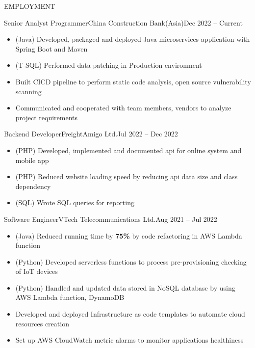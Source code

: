 \documentclass[]{resume}
\begin{document}
	\makeheader
	
	\begin{cvsection}{EMPLOYMENT}
		\begin{cvsubsection}{Senior Analyst Programmer}{China Construction Bank(Asia)}{Dec 2022 -- Current}
			\begin{itemize}
				\item (Java) Developed, packaged and deployed Java microservices application with Spring Boot and Maven
				\item (T-SQL) Performed data patching in Production environment 
				\item Built CICD pipeline to perform static code analysis, open source vulnerability scanning
				\item Communicated and cooperated with team members, vendors to analyze project requirements
			\end{itemize}
		\end{cvsubsection}
		
		\begin{cvsubsection}{Backend Developer}{FreightAmigo Ltd.}{Jul 2022 -- Dec 2022}
			\begin{itemize}
				\item (PHP) Developed, implemented and documented api for online system and mobile app
				\item (PHP) Reduced website loading speed by reducing api data size and class dependency
				\item (SQL) Wrote SQL queries for reporting
			\end{itemize}
		\end{cvsubsection}
		
		\begin{cvsubsection}{Software Engineer}{VTech Telecommunications Ltd.}{Aug 2021 -- Jul 2022}
			\begin{itemize}
				\item (Java) Reduced running time by \textbf{75\%} by code refactoring in AWS Lambda function
				\item (Python) Developed serverless functions to process pre-provisioning checking of IoT devices
				\item (Python) Handled and updated data stored in NoSQL database by using AWS Lambda function, DynamoDB
				\item Developed and deployed Infrastructure as code templates to automate cloud resources creation
				\item Set up AWS CloudWatch metric alarms to monitor applications healthiness
			\end{itemize}
		\end{cvsubsection}
		

\end{cvsection}
\end{document}

